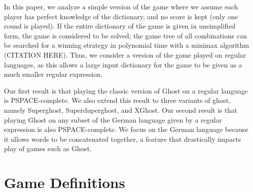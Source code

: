 \documentclass[runningheads,a4paper]{llncs}
\begin{document}
	In this paper, we analyze a simple version of the game where we assume each player has perfect knowledge of the dictionary, and no score is kept (only one round is played). If the entire dictionary of the game is given in unsimplified form, the game is considered to be solved; the game tree of all combinations can be searched for a winning strategy in polynomial time with a minimax algorithm (CITATION HERE). Thus, we consider a version of the game played on regular languages, as this allows a large input dictionary for the game to be given as a much smaller regular expression.

%


	Our first result is that playing the classic version of Ghost on a regular language is PSPACE-complete. We also extend this result to three variants of ghost, namely Superghost, Superduperghost, and XGhost. Our second result is that playing Ghost on any subset of the German language given by a regular expression is also PSPACE-complete. We focus on the German language because it allows words to be concatenated together, a feature that drastically impacts play of games such as Ghost.

%
%

\section{Game Definitions}
\label{Game Definitions}
\end{document}
